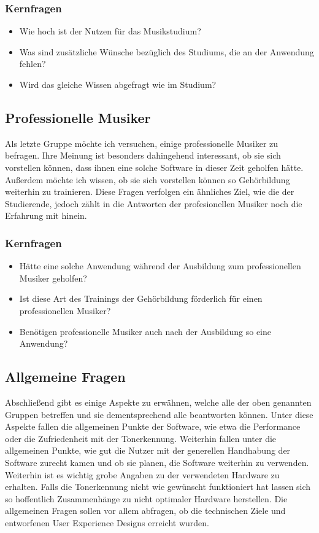 \subsubsection*{Kernfragen}
\begin{itemize}
    \item Wie hoch ist der Nutzen für das Musikstudium?
    \item Was sind zusätzliche Wünsche bezüglich des Studiums, die an der Anwendung fehlen?
    \item Wird das gleiche Wissen abgefragt wie im Studium?
\end{itemize}

\subsection{Professionelle Musiker}
Als letzte Gruppe möchte ich versuchen, einige professionelle Musiker zu befragen. Ihre Meinung ist besonders dahingehend interessant, ob sie sich vorstellen können, dass ihnen eine solche Software in dieser Zeit geholfen hätte. Außerdem möchte ich wissen, ob sie sich vorstellen können so Gehörbildung weiterhin zu trainieren. Diese Fragen verfolgen ein ähnliches Ziel, wie die der Studierende, jedoch zählt in die Antworten der profesionellen Musiker noch die Erfahrung mit hinein.   
\subsubsection*{Kernfragen}
\begin{itemize}
    \item Hätte eine solche Anwendung während der Ausbildung zum professionellen Musiker geholfen? 
    \item Ist diese Art des Trainings der Gehörbildung förderlich für einen professionellen Musiker?
    \item Benötigen professionelle Musiker auch nach der Ausbildung so eine Anwendung?
\end{itemize}

\subsection{Allgemeine Fragen}
Abschließend gibt es einige Aspekte zu erwähnen, welche alle der oben genannten Gruppen betreffen und sie dementsprechend alle beantworten können. Unter diese Aspekte fallen die allgemeinen Punkte der Software, wie etwa die Performance oder die Zufriedenheit mit der Tonerkennung. Weiterhin fallen unter die allgemeinen Punkte, wie gut die Nutzer mit der generellen Handhabung der Software zurecht kamen und ob sie planen, die Software weiterhin zu verwenden. Weiterhin ist es wichtig grobe Angaben zu der verwendeten Hardware zu erhalten. Falls die Tonerkennung nicht wie gewünscht funktioniert hat lassen sich so hoffentlich Zusammenhänge zu nicht optimaler Hardware herstellen. Die allgemeinen Fragen sollen vor allem abfragen, ob die technischen Ziele und entworfenen User Experience Designs erreicht wurden.
